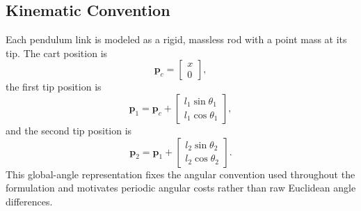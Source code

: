 \documentclass[conference]{IEEEtran}
\begin{document}
\subsection{Kinematic Convention}
Each pendulum link is modeled as a rigid, massless rod with a point mass at its tip. The cart position is
\begin{equation}
\bm{p}_c = \begin{bmatrix} x \\ 0 \end{bmatrix},
\end{equation}
the first tip position is
\begin{equation}
\bm{p}_1 = \bm{p}_c + \begin{bmatrix} l_1 \sin\theta_1 \\ l_1 \cos\theta_1 \end{bmatrix},
\end{equation}
and the second tip position is
\begin{equation}
\bm{p}_2 = \bm{p}_1 + \begin{bmatrix} l_2 \sin\theta_2 \\ l_2 \cos\theta_2 \end{bmatrix}.
\end{equation}
This global-angle representation fixes the angular convention used throughout the formulation and motivates periodic angular costs rather than raw Euclidean angle differences.
\end{document}
